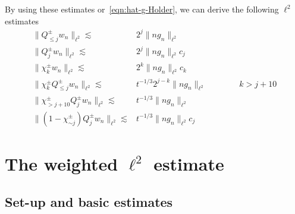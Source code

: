 \documentclass[letterpaper, reqno,final]{amsart}
\begin{document}
By using these estimates or~\eqref{eqn:hat-g-Holder}, we can derive the following $\ell^2$ estimates
\begin{equation}\label{eqn:w-ell2-al}\begin{split}
    \lVert Q_{\leq j}^\pm w_n \rVert_{\ell^2} \lesssim& 2^j \lVert ng_n \rVert_{\ell^2}\\ 
    \lVert Q^\pm_j w_n \rVert_{\ell^2} \lesssim& 2^j \lVert ng_n \rVert_{\ell^2} c_j\\ 
    \lVert \chi^\pm_k w_n \rVert_{\ell^2} \lesssim& 2^k \lVert ng_n \rVert_{\ell^2} c_k\\
    \lVert \chi_k^\pm Q_{\leq j}^\pm w_n \rVert_{\ell^2} \lesssim& t^{-1/3} 2^{j - k} \lVert ng_n \rVert_{\ell^2} \qquad\qquad k > j + 10\\ 
    \lVert \chi_{>j + 10}^\pm Q_j^\pm w_n \rVert_{\ell^2} \lesssim& t^{-1/3} \lVert ng_n \rVert_{\ell^2}\\ 
    \lVert (1 - \chi^\pm_{\sim j}) Q^\pm_j w_n \rVert_{\ell^2} \lesssim& t^{-1/3} \lVert ng_n \rVert_{\ell^2} c_j
\end{split}
\end{equation}
			
\section{The weighted \texorpdfstring{$\ell^2$}{l2} estimate\label{sec:n-ell2}}

\subsection{Set-up and basic estimates}
\end{document}
